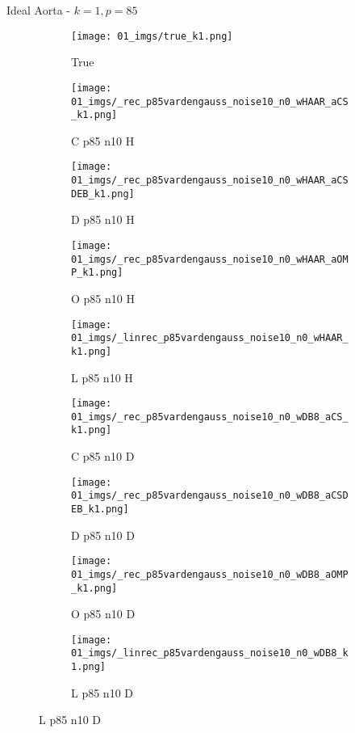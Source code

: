 \begin{frame}{Ideal Aorta - $k=1,p=85$}{}
\begin{figure}
\begin{subfigure}{0.1\textwidth}
\texttt{[image: 01\_imgs/true\_k1.png]}
\caption*{\Tiny True}
\end{subfigure}
\begin{subfigure}{0.1\textwidth}
\texttt{[image: 01\_imgs/\_rec\_p85vardengauss\_noise10\_n0\_wHAAR\_aCS\_k1.png]}
\caption*{\Tiny C p85 n10 H}
\end{subfigure}
\begin{subfigure}{0.1\textwidth}
\texttt{[image: 01\_imgs/\_rec\_p85vardengauss\_noise10\_n0\_wHAAR\_aCSDEB\_k1.png]}
\caption*{\Tiny D p85 n10 H}
\end{subfigure}
\begin{subfigure}{0.1\textwidth}
\texttt{[image: 01\_imgs/\_rec\_p85vardengauss\_noise10\_n0\_wHAAR\_aOMP\_k1.png]}
\caption*{\Tiny O p85 n10 H}
\end{subfigure}
\begin{subfigure}{0.1\textwidth}
\texttt{[image: 01\_imgs/\_linrec\_p85vardengauss\_noise10\_n0\_wHAAR\_k1.png]}
\caption*{\Tiny L p85 n10 H}
\end{subfigure}
\begin{subfigure}{0.1\textwidth}
\texttt{[image: 01\_imgs/\_rec\_p85vardengauss\_noise10\_n0\_wDB8\_aCS\_k1.png]}
\caption*{\Tiny C p85 n10 D}
\end{subfigure}
\begin{subfigure}{0.1\textwidth}
\texttt{[image: 01\_imgs/\_rec\_p85vardengauss\_noise10\_n0\_wDB8\_aCSDEB\_k1.png]}
\caption*{\Tiny D p85 n10 D}
\end{subfigure}
\begin{subfigure}{0.1\textwidth}
\texttt{[image: 01\_imgs/\_rec\_p85vardengauss\_noise10\_n0\_wDB8\_aOMP\_k1.png]}
\caption*{\Tiny O p85 n10 D}
\end{subfigure}
\begin{subfigure}{0.1\textwidth}
\texttt{[image: 01\_imgs/\_linrec\_p85vardengauss\_noise10\_n0\_wDB8\_k1.png]}
\caption*{\Tiny L p85 n10 D}
\end{subfigure}

\vspace{5pt}


\end{figure}
\end{frame}
